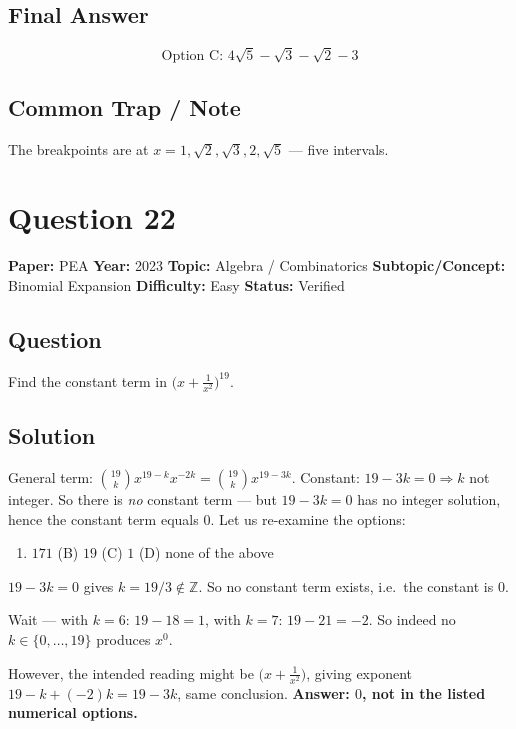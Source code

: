 \documentclass[11pt]{article}
\begin{document}
\subsection*{Final Answer}
\[
\boxed{\text{Option C: } 4\sqrt 5-\sqrt 3-\sqrt 2-3}
\]

\subsection*{Common Trap / Note}
The breakpoints are at $x=1,\sqrt 2,\sqrt 3,2,\sqrt 5$ --- five intervals.

\medskip

\section*{Question 22}
\textbf{Paper:} PEA \quad \textbf{Year:} 2023 \quad \textbf{Topic:} Algebra / Combinatorics \quad \textbf{Subtopic/Concept:} Binomial Expansion \quad \textbf{Difficulty:} Easy \quad \textbf{Status:} Verified

\subsection*{Question}
Find the constant term in $\bigl(x+\tfrac{1}{x^2}\bigr)^{19}$.

\subsection*{Solution}
General term: $\binom{19}{k}x^{19-k}x^{-2k}=\binom{19}{k}x^{19-3k}$. Constant: $19-3k=0\Rightarrow k$ not integer. So there is \emph{no} constant term --- but $19-3k=0$ has no integer solution, hence the constant term equals $\boxed{0}$. Let us re-examine the options:
\begin{enumerate}[label=(\Alph*)]
\item $171$ \quad (B) $19$ \quad (C) $1$ \quad (D) none of the above
\end{enumerate}
$19-3k=0$ gives $k=19/3\notin\mathbb Z$. So no constant term exists, i.e.\ the constant is $0$.

Wait --- with $k=6$: $19-18=1$, with $k=7$: $19-21=-2$. So indeed no $k\in\{0,\dots,19\}$ produces $x^0$.

However, the intended reading might be $\bigl(x+\tfrac{1}{x^{2}}\bigr)$, giving exponent $19-k+(-2)k=19-3k$, same conclusion. \textbf{Answer: $0$, not in the listed numerical options.}
\end{document}
